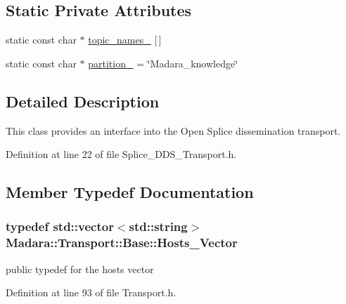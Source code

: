 \subsection*{Static Private Attributes}
\begin{DoxyCompactItemize}
\item 
static const char $\ast$ \hyperlink{classMadara_1_1Transport_1_1Splice__DDS__Transport_a1080968848e7917824f947a49f5d7d7e}{topic\_\-names\_\-} \mbox{[}$\,$\mbox{]}
\item 
static const char $\ast$ \hyperlink{classMadara_1_1Transport_1_1Splice__DDS__Transport_a0c6b219ff8ce5f4495c3416e582f94e2}{partition\_\-} = \char`\"{}Madara\_\-knowledge\char`\"{}
\end{DoxyCompactItemize}


\subsection{Detailed Description}
This class provides an interface into the Open Splice dissemination transport. 

Definition at line 22 of file Splice\_\-DDS\_\-Transport.h.



\subsection{Member Typedef Documentation}
\hypertarget{classMadara_1_1Transport_1_1Base_a2957ae0c413e07b7e276ae69ef1c320a}{
\subsubsection[{Hosts\_\-Vector}]{\setlength{\rightskip}{0pt plus 5cm}typedef std::vector$<$std::string$>$ {\bf Madara::Transport::Base::Hosts\_\-Vector}}}
\label{dc/d97/classMadara_1_1Transport_1_1Base_a2957ae0c413e07b7e276ae69ef1c320a}


public typedef for the hosts vector 



Definition at line 93 of file Transport.h.



